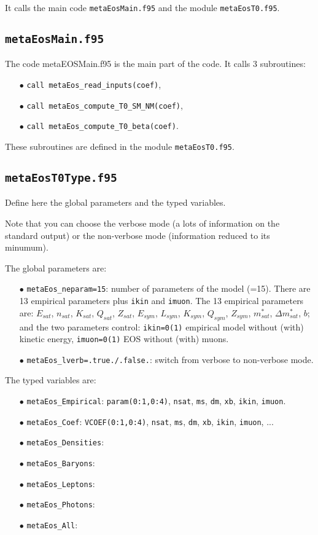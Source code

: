 \documentclass[11pt]{article}
\newcommand{\code}[1]{\colorbox{light-gray}{\mbox{\texttt{#1}}}}
\begin{document}
It calls the main code \code{metaEosMain.f95} and the module  \code{metaEosT0.f95}.

\subsection{\code{metaEosMain.f95}}

The code metaEOSMain.f95 is the main part of the code.
It calls 3 subroutines:
\begin{enumerate}
\item[$\bullet$] \code{call metaEos\_read\_inputs(coef)},
\item[$\bullet$] \code{call metaEos\_compute\_T0\_SM\_NM(coef)},
\item[$\bullet$] \code{call metaEos\_compute\_T0\_beta(coef)}.
\end{enumerate}

These subroutines are defined in the module \code{metaEosT0.f95}.

\subsection{\code{metaEosT0Type.f95}}

Define here the global parameters and the typed variables.

Note that you can choose the verbose mode (a lots of information on the standard output) or the non-verbose mode (information reduced to its minumum). 

The global parameters are:
\begin{enumerate}
\item[$\bullet$] \code{metaEos\_neparam=15}: number of parameters of the model (=15). There are 13 empirical parameters plus \code{ikin} and \code{imuon}. The 13 empirical parameters are: $E_{sat}$, $n_{sat}$, $K_{sat}$, $Q_{sat}$, $Z_{sat}$, $E_{sym}$, $L_{sym}$, $K_{sym}$, $Q_{sym}$, $Z_{sym}$, $m^*_{sat}$, $\Delta m^*_{sat}$, $b$; and the two parameters control: \code{ikin=0(1)} empirical model without (with) kinetic energy, \code{imuon=0(1)} EOS without (with) muons. 
\item[$\bullet$] \code{metaEos\_lverb=.true./.false.}: switch from verbose to non-verbose mode.
\end{enumerate}

The typed variables are:
\begin{enumerate}
\item[$\bullet$] \code{metaEos\_Empirical}: \code{param(0:1,0:4)}, \code{nsat}, \code{ms}, \code{dm}, \code{xb}, \code{ikin}, \code{imuon}.
\item[$\bullet$] \code{metaEos\_Coef}: \code{VCOEF(0:1,0:4)}, \code{nsat}, \code{ms}, \code{dm}, \code{xb}, \code{ikin}, \code{imuon}, ...
\item[$\bullet$] \code{metaEos\_Densities}:
\item[$\bullet$] \code{metaEos\_Baryons}:
\item[$\bullet$] \code{metaEos\_Leptons}:
\item[$\bullet$] \code{metaEos\_Photons}:
\item[$\bullet$] \code{metaEos\_All}:
\end{enumerate}
\end{document}
